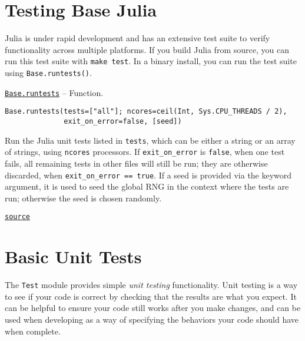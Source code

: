 \hypertarget{4048768246390644956}{}


\section{Testing Base Julia}



Julia is under rapid development and has an extensive test suite to verify functionality across multiple platforms. If you build Julia from source, you can run this test suite with \texttt{make test}. In a binary install, you can run the test suite using \texttt{Base.runtests()}.


\hypertarget{2272377293323848310}{} 
\hyperlink{2272377293323848310}{\texttt{Base.runtests}}  -- {Function.}

\begin{adjustwidth}{2em}{0pt}


\begin{verbatim}
Base.runtests(tests=["all"]; ncores=ceil(Int, Sys.CPU_THREADS / 2),
              exit_on_error=false, [seed])
\end{verbatim}

Run the Julia unit tests listed in \texttt{tests}, which can be either a string or an array of strings, using \texttt{ncores} processors. If \texttt{exit\_on\_error} is \texttt{false}, when one test fails, all remaining tests in other files will still be run; they are otherwise discarded, when \texttt{exit\_on\_error == true}. If a seed is provided via the keyword argument, it is used to seed the global RNG in the context where the tests are run; otherwise the seed is chosen randomly.



\href{https://github.com/JuliaLang/julia/blob/44fa15b1502a45eac76c9017af94332d4557b251/base/util.jl#L811-L821}{\texttt{source}}


\end{adjustwidth}

\hypertarget{1338422072110478503}{}


\section{Basic Unit Tests}



The \texttt{Test} module provides simple \emph{unit testing} functionality. Unit testing is a way to see if your code is correct by checking that the results are what you expect. It can be helpful to ensure your code still works after you make changes, and can be used when developing as a way of specifying the behaviors your code should have when complete.



